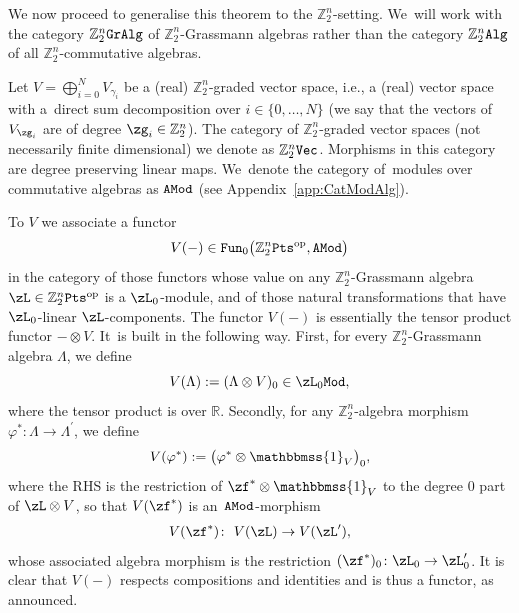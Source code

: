 \documentclass[pdftex]{sigma}%
\newcommand{\Id}{\mathbbmss{1}}
\newcommand{\op}[1]{\operatorname{#1}}
\newcommand{\catname}[1]{\textnormal{\texttt{#1}}}
\newcommand{\R}{{\mathbb R}}
\newcommand{\Z}{{\mathbb Z}}
\newcommand{\0}{\otimes}
\newcommand{\z}{\Z_2^n}
\numberwithin{equation}{section}
\begin{document}
We now proceed to generalise this theorem to the $\Z_2^n$-setting. We~will work with the category $\Z_2^n\tt GrAlg$ of $\Z_2^n$-Grassmann algebras rather than the category $\Z_2^n\tt Alg$ of all $\Z_2^n$-commutative algebras.

Let ${V} =\bigoplus_{i = 0}^{N} {V}_{\gamma_i}$ be a (real) $\Z_2^n$-graded vector space, i.e., a (real) vector space with a~direct sum decomposition over $i\in\{0,\dots,N\}$ (we say that the vectors of $V_{\zg_i}$ are of degree \mbox{$\zg_i\in\z$}). The category of $\Z_2^n$-graded vector spaces (not necessarily finite dimensional) we denote as $\Z_2^n\catname{Vec}$. Morphisms in this category are degree preserving linear maps. We~denote the category of~modu\-les over commutative algebras as $\tt AMod$ (see Appendix~\ref{app:CatModAlg}).

To $V$ we associate a functor
\begin{equation*}
{V}(-)\in{\tt Fun}_0\big(\Z_2^n\catname{Pts}^{\textnormal{op}},{\tt AMod}\big)
\end{equation*}
in the category of those functors whose value on any $\Z_2^n$-Grassmann algebra $\zL\in\Z_2^n{\tt Pts}^{\op{op}}$ is a $\zL_0$-module, and of those natural transformations that have $\zL_0$-linear $\zL$-components. The functor $V(-)$ is essentially the tensor product functor $-\0 V$. It~is built in the following way. First, for every $\Z_2^n$-Grassmann algebra $\Lambda$, we define
\[
{V}(\Lambda) :=(\Lambda \otimes {V})_0\in\zL_0\tt Mod,
\]
where the tensor product is over $\R$. Secondly, for any $\Z_2^n$-algebra morphism $\varphi^* \colon \Lambda \rightarrow \Lambda^\prime$, we define
\[
{V}(\varphi^*) := \big(\varphi^* \otimes \Id_{{V}}\big)_0,
\]
where the {\small RHS} is the restriction of $\zf^*\0\Id_{ V}$ to the degree 0 part of $\zL\0 V$, so that ${V}(\zf^*)$ is an~$\tt AMod$-morphism
\begin{gather}\label{CatAMod}
{V}(\zf^*)\colon\ {V}(\zL)\to {V}(\zL'),
\end{gather}
whose associated algebra morphism is the restriction $(\zf^*)_0\colon \zL_0\to\zL'_0$. It is clear that $V(-)$ respects compositions and identities and is thus a functor, as announced.
\end{document}
